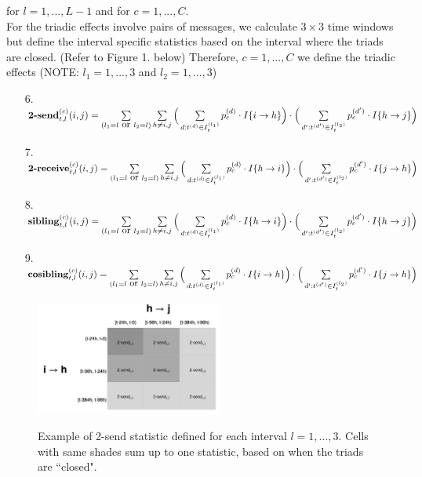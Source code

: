 \documentclass[a4paper]{article}
\begin{document}
for $l=1,...,L-1$ and for $c = 1,...,C$. \\ \newline For the triadic effects involve pairs of messages, we calculate $3 \times 3$ time windows but define the interval specific statistics based on the interval where the triads are closed. (Refer to Figure 1. below) Therefore, $c=1,...,C$ we define the triadic effects (NOTE: $l_1 = 1,...,3$ and $l_2 = 1,...,3$)
\begin{itemize}
	 	\item [6.] $\mbox{\textbf{2-send}}^{(c)}_{t, l}(i, j)=\sum\limits_{\substack{(l_1= l \mbox { or }  l_2 = l)} }\sum\limits_{h \neq i, j}\Big(\sum\limits_{d: t^{(d)} \in I_{t}^{(l_1)}}p_c^{(d)}\cdot I\{i\rightarrow h\}\Big)\cdot \Big(\sum\limits_{d': t^{(d')} \in I_{t}^{( l_2)}}p_c^{(d')}\cdot I\{h\rightarrow j\}\Big)$
 	\item [7.] $\mbox{\textbf{2-receive}}^{(c)}_{t, l}(i, j)=\sum\limits_{\substack{(l_1= l \mbox { or }  l_2 = l)} }\sum\limits_{h \neq i, j}\Big(\sum\limits_{d: t^{(d)} \in I_t^{(l_1)}}p_c^{(d)}\cdot I\{h\rightarrow i\}\Big)\cdot \Big(\sum\limits_{d': t^{(d')} \in I_t^{(l_2)}}p_c^{(d')}\cdot I\{j\rightarrow h\}\Big)$
 	\item [8.] $\mbox{\textbf{sibling}}^{(c)}_{t, l}(i, j)=\sum\limits_{\substack{(l_1= l \mbox { or }  l_2 = l)} }\sum\limits_{h \neq i, j}\Big(\sum\limits_{d: t^{(d)} \in I_t^{(l_1)}}p_c^{(d)}\cdot I\{h\rightarrow i\}\Big)\cdot \Big(\sum\limits_{d': t^{(d')} \in I_t^{(l_2)}}p_c^{(d')}\cdot I\{h\rightarrow j\}\Big)$
 	\item [9.] $\mbox{\textbf{cosibling}}^{(c)}_{t, l}(i, j)=\sum\limits_{\substack{(l_1= l \mbox { or }  l_2 = l)} }\sum\limits_{h \neq i, j}\Big(\sum\limits_{d: t^{(d)} \in I_t^{(l_1)}}p_c^{(d)}\cdot I\{i\rightarrow h\}\Big)\cdot \Big(\sum\limits_{d': t^{(d')} \in I_t^{(l_2)}}p_c^{(d')}\cdot I\{j\rightarrow h\}\Big)$
 \end{itemize}
 \begin{figure}[ht]
 	\centering
 	\includegraphics[width=0.55\textwidth]{triadtable.jpg} 
 	\label{fig:sim1diag}
 	\caption{Example of 2-send statistic defined for each interval $l=1,...,3$. Cells with same shades sum up to one statistic, based on when the triads are ``closed".}
 \end{figure}
\end{document}
